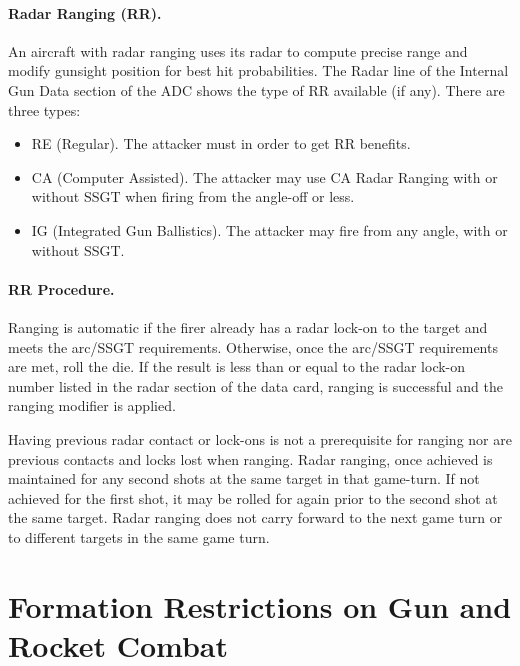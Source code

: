 \begin{advancedrules}
\paragraph{Radar Ranging (RR).} An aircraft with radar ranging uses its radar to compute precise range and modify gunsight position for best hit probabilities. The Radar line of the Internal Gun Data section of the ADC shows the type of RR available (if any). There are three types:

\begin{itemize}

\item RE (Regular). The attacker must  in order to get RR benefits.

\item CA (Computer Assisted). The attacker may use CA Radar Ranging with or without SSGT when firing from the  angle-off or less.

\item IG (Integrated Gun Ballistics). The attacker may fire from any angle, with or without SSGT.

\end{itemize}

\paragraph{RR Procedure.} Ranging is automatic if the firer already has a radar lock-on to the target and meets the arc/SSGT requirements. Otherwise, once the arc/SSGT requirements are met, roll the die. If the result is less than or equal to the radar lock-on number listed in the radar section of the data card, ranging is successful and the ranging modifier is applied.

Having previous radar contact or lock-ons is not a prerequisite for ranging nor are previous contacts and locks lost when ranging. Radar ranging, once achieved is maintained for any second shots at the same target in that game-turn. If not achieved for the first shot, it may be rolled for again prior to the second shot at the same target. Radar ranging does not carry forward to the next game turn or to different targets in the same game turn.


\section{Formation Restrictions on Gun and Rocket Combat}


\end{advancedrules}
